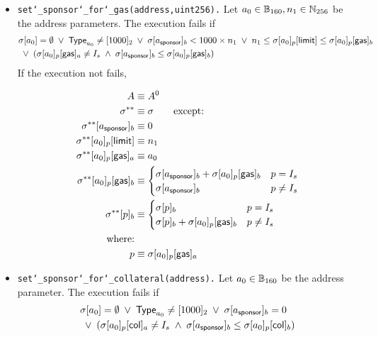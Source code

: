 \begin{itemize}
	\item {\tt set\char`_sponsor\char`_for\char`_gas(address,uint256).} Let $a_0\in \mathbb{B}_{160},n_1\in \mathbb{N}_{256}$ be the address parameters. The execution fails if 
	\begin{align}
		& \mathbf{\sigma}[a_0]=\emptyset \;\vee\; \mathsf{Type}_{a_0}\neq[1000]_2 \;\vee\; \mathbf{\sigma}[a_{\sf sponsor}]_b < 1000\times n_1 \;\vee\; n_1\le \mathbf{\sigma}[a_0]_p[{\sf limit}]\le \mathbf{\sigma}[a_0]_p[{\sf gas}]_b \notag \\ 
		& \;\vee\; (\mathbf{\sigma}[a_0]_p[{\sf gas}]_a \neq I_s \;\wedge\; \mathbf{\sigma}[a_{\sf sponsor}]_b\le \mathbf{\sigma}[a_0]_p[{\sf gas}]_b)  
	\end{align}
	If the execution not fails, 
	\begin{itemize}
		\begin{align}
			A & \equiv A^0 \\
			\mathbf{\sigma}^{**} &\equiv \mathbf{\sigma} \qquad \mbox{except:}\\
			\mathbf{\sigma}^{**}[a_{\sf sponsor}]_b &\equiv 0 \\ 
			\mathbf{\sigma}^{**}[a_0]_p[{\sf limit}] &\equiv n_1\\ 
			\mathbf{\sigma}^{**}[a_0]_p[{\sf gas}]_a &\equiv a_0\\ 
			\mathbf{\sigma}^{**}[a_0]_p[{\sf gas}]_b &\equiv \begin{cases}
				\mathbf{\sigma}[a_{\sf sponsor}]_b + \mathbf{\sigma}[a_0]_p[{\sf gas}]_b& p = I_s\\ 
				\mathbf{\sigma}[a_{\sf sponsor}]_b& p \neq I_s
			\end{cases}\\ 
			\mathbf{\sigma}^{**}[p]_b &\equiv \begin{cases}
				\mathbf{\sigma}[p]_b & p = I_s\\ 
				\mathbf{\sigma}[p]_b + \mathbf{\sigma}[a_0]_p[{\sf gas}]_b& p \neq I_s
			\end{cases}\\
			\mbox{where:}& \\
			p & \equiv \mathbf{\sigma}[a_0]_p[{\sf gas}]_a
		\end{align}
	\end{itemize}
	\item {\tt set\char`_sponsor\char`_for\char`_collateral(address).} Let $a_0\in \mathbb{B}_{160}$ be the address parameter. The execution fails if 
	\begin{align}
		& \st[a_0]=\emptyset \;\vee\; \mathsf{Type}_{a_0}\neq[1000]_2 \;\vee\; \st[a_{\sf sponsor}]_b = 0  \notag \\ 
		& \;\vee\; (\st[a_0]_p[{\sf col}]_a \neq I_s \;\wedge\; \st[a_{\sf sponsor}]_b\le \st[a_0]_p[{\sf col}]_b)  

\end{align}
\end{itemize}
